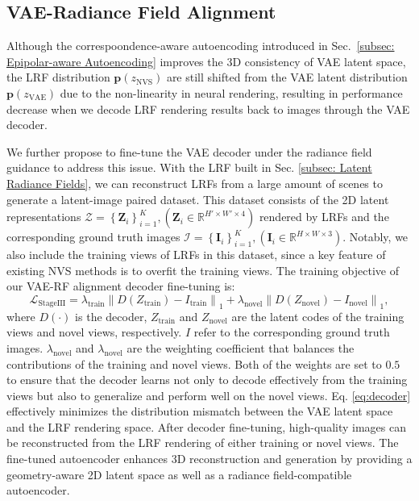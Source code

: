 \subsection{VAE-Radiance Field Alignment} \label{subsec: Radiance Field-Guided Image Decoding}
Although the correspoondence-aware autoencoding introduced in Sec.~\ref{subsec: Epipolar-aware Autoencoding} improves the 3D consistency of VAE latent space, the LRF distribution $\boldsymbol{p}(z_{\text{NVS}})$ are still shifted from the VAE latent distribution $\boldsymbol{p}(z_{\text{VAE}})$ due to the non-linearity in neural rendering, resulting in performance decrease when we decode LRF rendering results back to images through the VAE decoder. 

We further propose to fine-tune the VAE decoder under the radiance field guidance to address this issue. With the LRF built in Sec. \ref{subsec: Latent Radiance Fields}, we can reconstruct LRFs from a large amount of scenes to generate a latent-image paired dataset. This dataset consists of the 2D latent representations $\mathcal{Z}=\left\{\boldsymbol{Z}_i\right\}_{i=1}^K,\left(\boldsymbol{Z}_i \in \mathbb{R}^{H' \times W' \times 4}\right)$ rendered by LRFs and the corresponding ground truth images $\mathcal{I}=\left\{\boldsymbol{I}_i\right\}_{i=1}^K,\left(\boldsymbol{I}_i \in \mathbb{R}^{H \times W \times 3}\right)$. Notably, we also include the training views of LRFs in this dataset, since a key feature of existing NVS methods is to overfit the training views. 
The training objective of our VAE-RF alignment decoder fine-tuning is:
\begin{equation} 
\mathcal{L}_\text{StageIII}=  \lambda_{\text{train}} \left\|D(Z_{\text{train}}) - I_{\text{train}} \right\|_1 + \lambda_{\text{novel}} \left\|D(Z_{\text{novel}}) - I_{\text{novel}}\right\|_1,
\label{eq:decoder}
\end{equation} 
where $D(\cdot)$ is the decoder, $Z_{\text{train}}$ and $Z_{\text{novel}}$  are the latent codes of the training views and novel views, respectively. $I$ refer to the corresponding ground truth images. $\lambda_{\text{novel}}$ and $\lambda_{\text{novel}}$ are the weighting coefficient that balances the contributions of the training and novel views. Both of the weights are set to $0.5$ to ensure that the decoder learns not only to decode effectively from the training views but also to generalize and perform well on the novel views.
Eq. \ref{eq:decoder} effectively minimizes the distribution mismatch between the VAE latent space and the LRF rendering space. After decoder fine-tuning, high-quality images can be reconstructed from the LRF rendering of either training or novel views. The fine-tuned autoencoder enhances 3D reconstruction and generation by providing a geometry-aware 2D latent space as well as a radiance field-compatible autoencoder.





